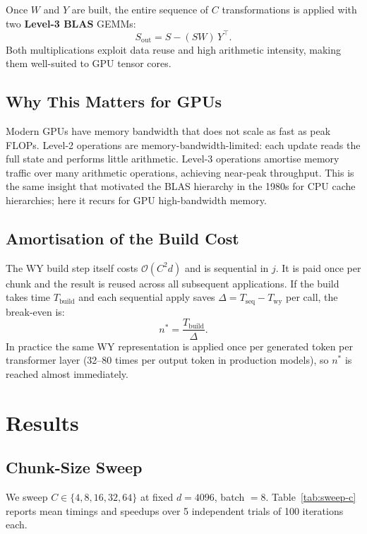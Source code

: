 \documentclass{article} %
\begin{document}
Once $W$ and $Y$ are built, the entire sequence of $C$ transformations is applied with
two \textbf{Level-3 BLAS} GEMMs:
\[
  S_{\text{out}} = S - (S W)\, Y^\top.
\]
Both multiplications exploit data reuse and high arithmetic intensity, making them
well-suited to GPU tensor cores.

\subsection{Why This Matters for GPUs}

Modern GPUs have memory bandwidth that does not scale as fast as peak FLOPs. Level-2
operations are memory-bandwidth-limited: each update reads the full state and performs
little arithmetic. Level-3 operations amortise memory traffic over many arithmetic
operations, achieving near-peak throughput. This is the same insight that motivated
the BLAS hierarchy in the 1980s for CPU cache hierarchies; here it recurs for GPU
high-bandwidth memory.

\subsection{Amortisation of the Build Cost}

The WY build step itself costs $\mathcal{O}(C^2 d)$ and is sequential in $j$.
It is paid once per chunk and the result is reused across all subsequent applications.
If the build takes time $T_{\text{build}}$ and each sequential apply saves
$\Delta = T_{\text{seq}} - T_{\text{wy}}$ per call, the break-even is:
\[
  n^* = \frac{T_{\text{build}}}{\Delta}.
\]
In practice the same WY representation is applied once per generated token per
transformer layer (32--80 times per output token in production models), so $n^*$
is reached almost immediately.

\section{Results}
\label{sec:results}

\subsection{Chunk-Size Sweep}

We sweep $C \in \{4, 8, 16, 32, 64\}$ at fixed $d = 4096$, batch $= 8$.
Table~\ref{tab:sweep-c} reports mean timings and speedups over 5 independent trials
of 100 iterations each.
\end{document}
